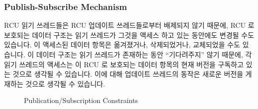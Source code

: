 \fi

\subsubsection{Publish-Subscribe Mechanism}
\label{sec:defer:Publish-Subscribe Mechanism}

RCU 읽기 쓰레드들은 RCU 업데이트 쓰레드들로부터 배제되지 않기 때문에, RCU 로
보호되는 데이터 구조는 읽기 쓰레드가 그것을 액세스 하고 있는 동안에도 변경될
수도 있습니다.
이 액세스된 데이터 항목은 옮겨졌거나, 삭제되었거나, 교체되었을 수도 있습니다.
이 데이터 구조는 읽기 쓰레드가 존재하는 동안 ``기다려주지'' 않기 때문에, 각
읽기 쓰레드의 액세스는 이 RCU 로 보호되는 데이터 항목의 현재 버전을 구독하고
있는 것으로 생각될 수 있습니다.
이에 대해 업데이트 쓰레드의 동작은 새로운 버전을 게재하는 것으로 생각될 수
있습니다.

\begin{figure}[tbp]
\centering
{}
\caption{Publication/Subscription Constraints}
\label{fig:defer:Publication/Subscription Constraints}
\end{figure}

